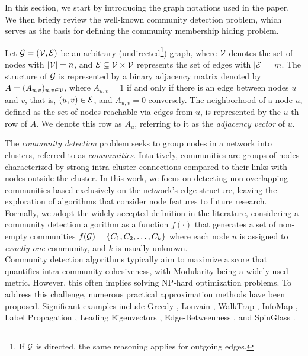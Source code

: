 In this section, we start by introducing the graph notations used in the paper. We then briefly review the well-known community detection problem, which serves as the basis for defining the community membership hiding problem.


Let $\mathcal{G} =(\mathcal{V},\mathcal{E})$ be an arbitrary (undirected\footnote{If $\mathcal{G}$ is directed, the same reasoning applies for outgoing edges.}) graph, where $\mathcal{V}$ denotes the set of nodes with $|\mathcal{V}|=n$, and $\mathcal{E} \subseteq \mathcal{V} \times \mathcal{V}$ represents the set of edges with $|\mathcal{E}|=m$. The structure of $\mathcal{G}$ is represented by a binary adjacency matrix denoted by $A = (A_{u,v})_{u,v \in \mathcal{V}}$, where $A_{u,v} = 1$ if and only if there is an edge between nodes $u$ and $v$, that is, $(u,v) \in \mathcal{E}$, and $A_{u,v} = 0$ conversely. 
The neighborhood of a node $u$, defined as the set of nodes reachable via edges from $u$, is represented by the $u$-th row of $A$. We denote this row as $A_u$, referring to it as the \emph{adjacency vector} of $u$. 


The \emph{community detection} problem seeks to group nodes in a network into clusters, referred to as \emph{communities}. Intuitively, communities are groups of nodes characterized by strong intra-cluster connections compared to their links with nodes outside the cluster. In this work, we focus on detecting non-overlapping communities based exclusively on the network's edge structure, leaving the exploration of algorithms that consider node features to future research.
Formally, we adopt the widely accepted definition in the literature, considering a community detection algorithm as a function $f(\cdot)$ that generates a set of non-empty communities $f(\mathcal{G}) = \{C_1,C_2,\dotsc,C_k\}$ where each node $u$  is assigned to \emph{exactly one} community, and $k$ is usually unknown. \\
Community detection algorithms typically aim to maximize a score that quantifies intra-community cohesiveness, with Modularity \cite{newman2006pnas} being a widely used metric. However, this often implies solving NP-hard optimization problems. To address this challenge, numerous practical approximation methods have been proposed. Significant examples include Greedy \cite{greedy_detection_alg}, Louvain \cite{louvain_detection_alg}, WalkTrap \cite{walktrap_detection_alg},  InfoMap \cite{infomap_detection_alg}, Label Propagation \cite{label_detection_alg}, Leading Eigenvectors \cite{eigenvectors_detection_alg}, Edge-Betweenness \cite{edge_detection_alg}, and SpinGlass \cite{spinglass_detection_alg}. 

